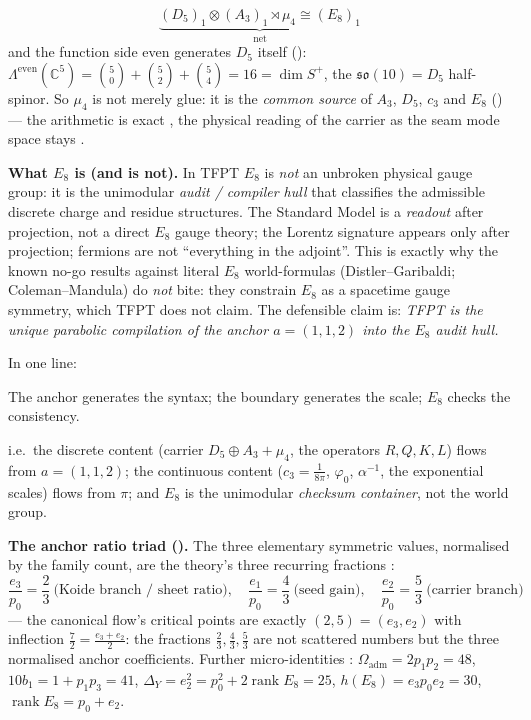 \documentclass[11pt,a4paper]{article}
\newcommand{\cthree}{c_3}
\newcommand{\ainv}{\alpha^{-1}}
\begin{document}
\vspace{-3mm}
\[
  \underbrace{(D_5)_1\otimes(A_3)_1\rtimes\mu_4\cong(E_8)_1}_{\text{net}}
\]
and the function side even generates $D_5$ itself ():
$\Lambda^{\mathrm{even}}(\mathbb C^5)=\binom50+\binom52+\binom54=16=\dim S^+$, the $\mathfrak{so}(10)=D_5$
half-spinor. So $\mu_4$ is not merely glue: it is the \emph{common source} of $A_3$, $D_5$, $\cthree$ and
$E_8$ () --- the arithmetic is exact \mE, the physical reading of the
carrier as the seam mode space stays \mC.
\par\smallskip
\noindent\textbf{What $E_8$ is (and is not).} In TFPT $E_8$ is \emph{not} an unbroken physical gauge group:
it is the unimodular \emph{audit / compiler hull} that classifies the admissible discrete charge and
residue structures. The Standard Model is a \emph{readout} after projection, not a direct $E_8$ gauge
theory; the Lorentz signature appears only after projection; fermions are not ``everything in the
adjoint''. This is exactly why the known no-go results against literal $E_8$ world-formulas
(Distler--Garibaldi; Coleman--Mandula) do \emph{not} bite: they constrain $E_8$ as a spacetime gauge
symmetry, which TFPT does not claim. The defensible claim is: \emph{TFPT is the unique parabolic
compilation of the anchor $a=(1,1,2)$ into the $E_8$ audit hull.}
\par\smallskip
\noindent In one line:
\begin{keyeq}
The anchor generates the syntax; the boundary generates the scale; $E_8$ checks the consistency.
\end{keyeq}
i.e.\ the discrete content (carrier $D_5\oplus A_3+\mu_4$, the operators $R,Q,K,L$) flows from
$a=(1,1,2)$; the continuous content ($c_3=\tfrac1{8\pi}$, $\varphi_0$, $\ainv$, the exponential scales) flows
from $\pi$; and $E_8$ is the unimodular \emph{checksum container}, not the world group.
\par\smallskip
\noindent\textbf{The anchor ratio triad ().} The three elementary
symmetric values, normalised by the family count, are the theory's three recurring fractions \mE:
\[
  \frac{e_3}{p_0}=\frac23\ \text{(Koide branch / sheet ratio)},\quad
  \frac{e_1}{p_0}=\frac43\ \text{(seed gain)},\quad
  \frac{e_2}{p_0}=\frac53\ \text{(carrier branch)}
\]
--- the canonical flow's critical points are exactly $(2,5)=(e_3,e_2)$ with inflection
$\tfrac72=\tfrac{e_3+e_2}2$: the fractions $\tfrac23,\tfrac43,\tfrac53$ are not scattered numbers but the
three normalised anchor coefficients. Further micro-identities \mE:
$\Omega_{\mathrm{adm}}=2p_1p_2=48$, $10b_1=1+p_1p_3=41$,
$\Delta_Y=e_2^2=p_0^2+2\operatorname{rank}E_8=25$, $h(E_8)=e_3p_0e_2=30$,
$\operatorname{rank}E_8=p_0+e_2$.
\end{document}
